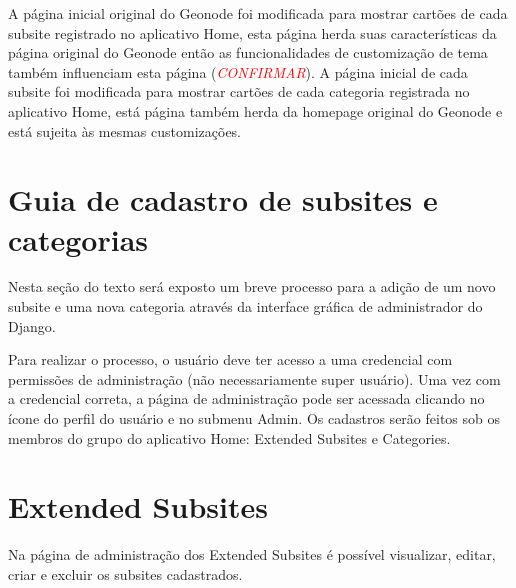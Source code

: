 \documentclass[12pt]{article}
\begin{document}
A página inicial original do Geonode foi modificada para mostrar cartões de
cada subsite registrado no aplicativo Home, esta página herda suas
características da página original do Geonode então as funcionalidades de
customização de tema também influenciam esta página
(\textcolor{red}{\emph{CONFIRMAR}}). A página inicial de cada subsite foi
modificada para mostrar cartões de cada categoria registrada no aplicativo
Home, está página também herda da homepage original do Geonode e está sujeita
às mesmas customizações.

\section{Guia de cadastro de subsites e categorias}

Nesta seção do texto será exposto um breve processo para a adição de um novo
subsite e uma nova categoria através da interface gráfica de administrador do
Django. 

Para realizar o processo, o usuário deve ter acesso a uma credencial com
permissões de administração (não necessariamente super usuário). Uma vez com a
credencial correta, a página de administração pode ser acessada clicando no
ícone do perfil do usuário e no submenu Admin. Os cadastros serão feitos sob os
membros do grupo do aplicativo Home: Extended Subsites e Categories.

\section{Extended Subsites}

Na página de administração dos Extended Subsites é possível visualizar, editar,
criar e excluir os subsites cadastrados.
\end{document}
